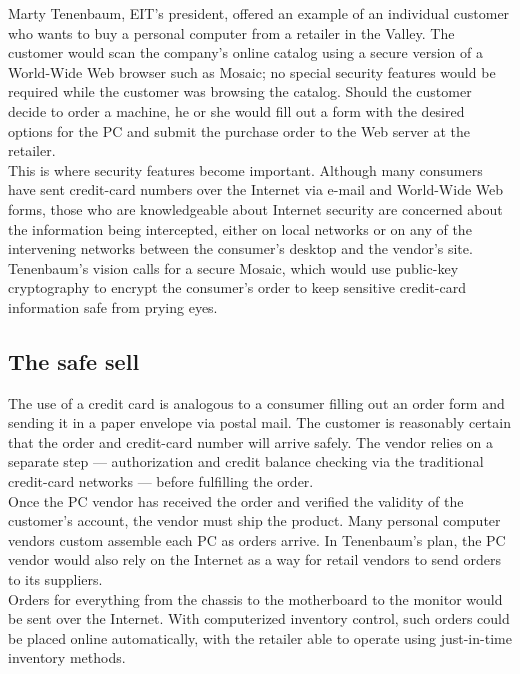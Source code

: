 Marty Tenenbaum, EIT's president, offered an example of an individual
customer who wants to buy a personal computer from a retailer in the
Valley. The customer would scan the company's online catalog using a
secure version of a World-Wide Web browser such as Mosaic; no special
security features would be required while the customer was browsing the
catalog. Should the customer decide to order a machine, he or she would
fill out a form with the desired options for the PC and submit the
purchase order to the Web server at the retailer.\\

This is where security features become important. Although many
consumers have sent credit-card numbers over the Internet via e-mail
and World-Wide Web forms, those who are knowledgeable about Internet
security are concerned about the information being intercepted, either
on local networks or on any of the intervening networks between the
consumer's desktop and the vendor's site. Tenenbaum's vision calls for
a secure Mosaic, which would use public-key cryptography to encrypt the
consumer's order to keep sensitive credit-card information safe from
prying eyes.

\subsection{The safe sell}
The use of a credit card is analogous to a consumer filling out an order
form and sending it in a paper envelope via postal mail. The customer is
reasonably certain that the order and credit-card number will arrive
safely. The vendor relies on a separate step --- authorization and credit
balance checking via the traditional credit-card
networks --- before fulfilling the order.\\

Once the PC vendor has received the order and verified the validity of
the customer's account, the vendor must ship the product. Many personal
computer vendors custom assemble each PC as orders arrive. In
Tenenbaum's plan, the PC vendor would also rely on the Internet as a
way for retail vendors to send orders to its suppliers.\\

Orders for everything from the chassis to the motherboard to the
monitor would be sent over the Internet. With computerized inventory
control, such orders could be placed online automatically, with the
retailer able to operate using just-in-time inventory methods.\\

